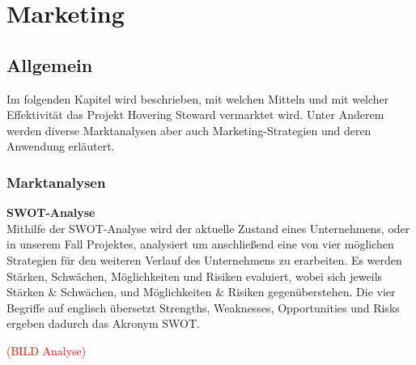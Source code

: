 \chapter{Marketing}
\renewcommand{\kapitelautor}{Autor: Markus Kaiser}

\section{Allgemein}
Im folgenden Kapitel wird beschrieben, mit welchen Mitteln und mit welcher Effektivität
das Projekt Hovering Steward vermarktet wird. Unter Anderem werden diverse Marktanalysen
aber auch Marketing-Strategien und deren Anwendung erläutert.

  \subsection{Marktanalysen}
  \textbf{SWOT-Analyse}\\
  Mithilfe der SWOT-Analyse wird der aktuelle Zustand eines Unternehmens, oder in unserem Fall Projektes, analysiert um anschließend eine von vier möglichen Strategien
  für den weiteren Verlauf des Unternehmens zu erarbeiten. Es werden Stärken, Schwächen, Möglichkeiten und Risiken evaluiert, wobei sich jeweils Stärken \& Schwächen, und
  Möglichkeiten \& Risiken gegenüberstehen. Die vier Begriffe auf englisch übersetzt Strengths, Weaknesses, Opportunities und Risks ergeben dadurch das Akronym SWOT.

  \textcolor{red}{(BILD Analyse)}\\

